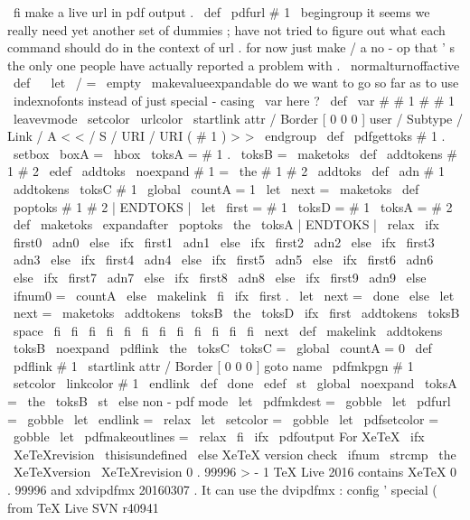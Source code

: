 {{\
fi
%
make
a
live
url
in
pdf
output
.
\
def
\
pdfurl
#
1
{
%
\
begingroup
%
it
seems
we
really
need
yet
another
set
of
dummies
;
have
not
%
tried
to
figure
out
what
each
command
should
do
in
the
context
%
of
url
.
for
now
just
make
/
a
no
-
op
that
'
s
the
only
one
%
people
have
actually
reported
a
problem
with
.
%
\
normalturnoffactive
\
def
\
{
}
%
\
let
\
/
=
\
empty
\
makevalueexpandable
%
do
we
want
to
go
so
far
as
to
use
\
indexnofonts
instead
of
just
%
special
-
casing
\
var
here
?
\
def
\
var
#
#
1
{
#
#
1
}
%
%
\
leavevmode
\
setcolor
{
\
urlcolor
}
%
\
startlink
attr
{
/
Border
[
0
0
0
]
}
%
user
{
/
Subtype
/
Link
/
A
<
<
/
S
/
URI
/
URI
(
#
1
)
>
>
}
%
\
endgroup
}
\
def
\
pdfgettoks
#
1
.
{
\
setbox
\
boxA
=
\
hbox
{
\
toksA
=
{
#
1
.
}
\
toksB
=
{
}
\
maketoks
}
}
\
def
\
addtokens
#
1
#
2
{
\
edef
\
addtoks
{
\
noexpand
#
1
=
{
\
the
#
1
#
2
}
}
\
addtoks
}
\
def
\
adn
#
1
{
\
addtokens
{
\
toksC
}
{
#
1
}
\
global
\
countA
=
1
\
let
\
next
=
\
maketoks
}
\
def
\
poptoks
#
1
#
2
|
ENDTOKS
|
{
\
let
\
first
=
#
1
\
toksD
=
{
#
1
}
\
toksA
=
{
#
2
}
}
\
def
\
maketoks
{
%
\
expandafter
\
poptoks
\
the
\
toksA
|
ENDTOKS
|
\
relax
\
ifx
\
first0
\
adn0
\
else
\
ifx
\
first1
\
adn1
\
else
\
ifx
\
first2
\
adn2
\
else
\
ifx
\
first3
\
adn3
\
else
\
ifx
\
first4
\
adn4
\
else
\
ifx
\
first5
\
adn5
\
else
\
ifx
\
first6
\
adn6
\
else
\
ifx
\
first7
\
adn7
\
else
\
ifx
\
first8
\
adn8
\
else
\
ifx
\
first9
\
adn9
\
else
\
ifnum0
=
\
countA
\
else
\
makelink
\
fi
\
ifx
\
first
.
\
let
\
next
=
\
done
\
else
\
let
\
next
=
\
maketoks
\
addtokens
{
\
toksB
}
{
\
the
\
toksD
}
\
ifx
\
first
\
addtokens
{
\
toksB
}
{
\
space
}
\
fi
\
fi
\
fi
\
fi
\
fi
\
fi
\
fi
\
fi
\
fi
\
fi
\
fi
\
fi
\
next
}
\
def
\
makelink
{
\
addtokens
{
\
toksB
}
%
{
\
noexpand
\
pdflink
{
\
the
\
toksC
}
}
\
toksC
=
{
}
\
global
\
countA
=
0
}
\
def
\
pdflink
#
1
{
%
\
startlink
attr
{
/
Border
[
0
0
0
]
}
goto
name
{
\
pdfmkpgn
{
#
1
}
}
\
setcolor
{
\
linkcolor
}
#
1
\
endlink
}
\
def
\
done
{
\
edef
\
st
{
\
global
\
noexpand
\
toksA
=
{
\
the
\
toksB
}
}
\
st
}
\
else
%
non
-
pdf
mode
\
let
\
pdfmkdest
=
\
gobble
\
let
\
pdfurl
=
\
gobble
\
let
\
endlink
=
\
relax
\
let
\
setcolor
=
\
gobble
\
let
\
pdfsetcolor
=
\
gobble
\
let
\
pdfmakeoutlines
=
\
relax
\
fi
%
\
ifx
\
pdfoutput
%
%
For
XeTeX
%
\
ifx
\
XeTeXrevision
\
thisisundefined
\
else
%
%
XeTeX
version
check
%
\
ifnum
\
strcmp
{
\
the
\
XeTeXversion
\
XeTeXrevision
}
{
0
.
99996
}
>
-
1
%
TeX
Live
2016
contains
XeTeX
0
.
99996
and
xdvipdfmx
20160307
.
%
It
can
use
the
dvipdfmx
:
config
'
special
(
from
TeX
Live
SVN
r40941
}}
